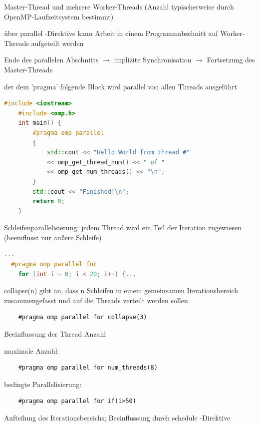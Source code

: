 \documentclass[10pt]{article}
\begin{document}
\begin{itemize*}
  \item Master-Thread und mehrere Worker-Threads (Anzahl typischerweise durch OpenMP-Laufzeitsystem bestimmt)
  \item über parallel -Direktive kann Arbeit in einem Programmabschnitt auf Worker-Threads aufgeteilt werden
  \item Ende des parallelen Abschnitts $\rightarrow$ implizite Synchronisation $\rightarrow$ Fortsetzung des Master-Threads
  \item der dem 'pragma' folgende Block wird parallel von allen Threads ausgeführt
  \begin{lstlisting}[language=C++]
    #include <iostream>
    #include <omp.h>
    int main() {
        #pragma omp parallel
        {
            std::cout << "Hello World from thread #"
            << omp_get_thread_num() << " of "
            << omp_get_num_threads() << "\n";
        }
        std::cout << "Finished!\n";
        return 0;
    }
    \end{lstlisting}
  \item Schleifenparallelisierung: jedem Thread wird ein Teil der Iteration zugewiesen (beeinflusst nur äußere Schleife)
  \begin{lstlisting}[language=C++]
  ...
  #pragma omp parallel for
    for (int i = 0; i < 20; i++) {...
  \end{lstlisting}
  \begin{itemize*}
    \item collapse(n) gibt an, dass n Schleifen in einem gemeinsamen Iterationsbereich zusammengefasst und auf die Threads verteilt werden sollen
    \begin{lstlisting}
    #pragma omp parallel for collapse(3)
    \end{lstlisting}
  \end{itemize*}
  \item Beeinflussung der Thread Anzahl
  \begin{itemize*}
    \item maximale Anzahl:
    \begin{lstlisting}
    #pragma omp parallel for num_threads(8)
    \end{lstlisting}
    \item bedingte Parallelisierung:
    \begin{lstlisting}
    #pragma omp parallel for if(i>50)
    \end{lstlisting}
  \end{itemize*}
  \item Aufteilung des Iterationsbereichs; Beeinflussung durch schedule -Direktive

\end{itemize*}
\end{document}
